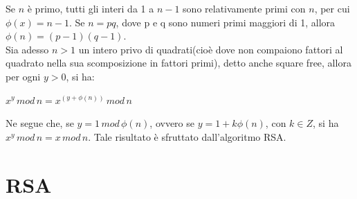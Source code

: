 Se $n$ è primo, tutti gli interi da 1 a $n-1$ sono relativamente primi con $n$, per cui $\phi(x) = n - 1$. Se $n = pq$, dove p e q sono numeri primi maggiori di 1, allora $\phi(n) = (p-1)(q-1)$. \\
Sia adesso $n > 1$ un intero privo di quadrati(cioè dove non compaiono fattori al quadrato nella sua scomposizione in fattori primi), detto anche square free, allora per ogni $y > 0$, si ha: \begin{center}
$x^y \, mod \, n = x^{(y + \phi(n) )} \, mod \, n$
\end{center} Ne segue che, se $ y = 1 \, mod \, \phi(n) $, ovvero se $y = 1 + k \phi(n) $, con $k \in Z$, si ha $x^y \, mod \, n = x \, mod \, n $. Tale risultato è sfruttato dall'algoritmo RSA.

\section{RSA}

